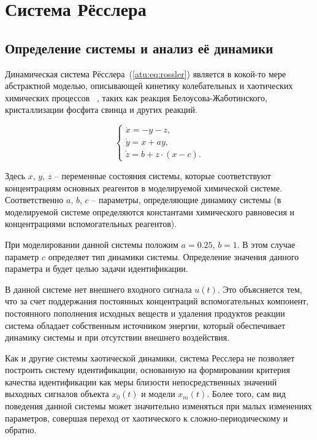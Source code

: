 
\FloatBarrier
\section{Система Рёсслера} %
\label{atu:sect:ross}


\subsection{Определение системы и анализ её динамики} %

Динамическая система Рёсслера~(\ref{atu:eq:rossler})
является в кокой-то мере абстрактной моделью,
описывающей кинетику колебательных и хаотических химических процессов
~\cite{neimark_stoch_chaos_vibro,koltsova_nl_dyn_chem,berje_order_in_chaos,chulichkcov_mm_ml_dyn},
таких как реакция Белоусова-Жаботинского, кристаллизации фосфита свинца и других реакций.


\begin{equation}
\begin{cases}
  \dot{x}  = -y - z  ,  \\
  \dot{y}  = x + a y ,\\
  \dot{z}  = b + z \cdot ( x-c ) .
\end{cases}
\label{atu:eq:rossler}
\end{equation}

Здесь \(x\), \(y\), \(z\) -- переменные состояния системы,
которые соответствуют концентрациям основных реагентов
в моделируемой химической системе.
Соответственно \(a\), \(b\), \(c\) --
параметры, определяющие динамику системы
(в моделируемой системе определяются константами химического равновесия
и концентрациями вспомогательных реагентов).

При моделировании данной системы положим
\(a=0.25\), \(b=1\).
В этом случае параметр \(c\) определяет
тип динамики системы.
Определение значения данного параметра и будет
целью задачи идентификации.

В данной системе нет внешнего входного сигнала \( u(t) \).
Это объясняется тем, что за счет
поддержания постоянных концентраций вспомогательных
компонент, постоянного пополнения исходных веществ
и удаления продуктов реакции система обладает
собственным источником энергии, который обеспечивает
динамику системы и при отсутствии
внешнего воздействия.

Как и другие системы хаотической динамики, система Ресслера
не позволяет построить систему идентификации, основанную
на формировании критерия качества идентификации
как меры близости непосредственных значений выходных сигналов
объекта \( x_0(t) \) и модели \( x_m(t) \).
Более того, сам вид поведения данной системы может значительно изменяться
при малых изменениях параметров, совершая переход от
хаотического к сложно-периодическому и обратно.

